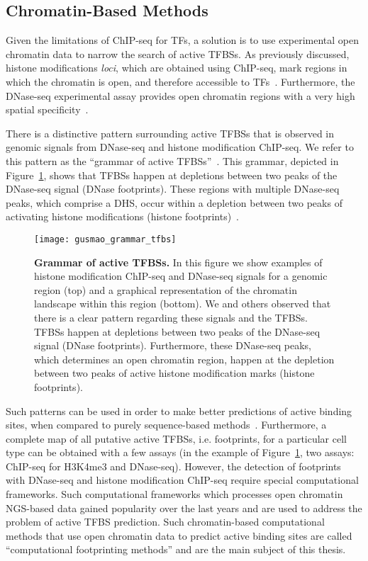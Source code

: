 \subsection{Chromatin-Based Methods}
\label{sec:chromatin.based.method}

Given the limitations of ChIP-seq for TFs, a solution is to use experimental open chromatin data to narrow the search of active TFBSs. As previously discussed, histone modifications \emph{loci}, which are obtained using ChIP-seq, mark regions in which the chromatin is open, and therefore accessible to TFs~\citep{park2009}. Furthermore, the DNase-seq experimental assay provides open chromatin regions with a very high spatial specificity~\citep{boyle2008b}.

There is a distinctive pattern surrounding active TFBSs that is observed in genomic signals from DNase-seq and histone modification ChIP-seq. We refer to this pattern as the ``grammar of active TFBSs''~\citep{gusmao2012,gusmao2014}. This grammar, depicted in Figure~\ref{fig:gusmao_grammar_tfbs}, shows that TFBSs happen at depletions between two peaks of the DNase-seq signal (DNase footprints). These regions with multiple DNase-seq peaks, which comprise a DHS, occur within a depletion between two peaks of activating histone modifications (histone footprints)~\citep{boyle2011,gusmao2014}.

\begin{figure}[h!]
\centering
\texttt{[image: gusmao\_grammar\_tfbs]}
\caption[Grammar of active TFBSs]{\textbf{Grammar of active TFBSs.} In this figure we show examples of histone modification ChIP-seq and DNase-seq signals for a genomic region (top) and a graphical representation of the chromatin landscape within this region (bottom). We and others observed that there is a clear pattern regarding these signals and the TFBSs. TFBSs happen at depletions between two peaks of the DNase-seq signal (DNase footprints). Furthermore, these DNase-seq peaks, which determines an open chromatin region, happen at the depletion between two peaks of active histone modification marks (histone footprints).}
\label{fig:gusmao_grammar_tfbs}
\end{figure}

Such patterns can be used in order to make better predictions of active binding sites, when compared to purely sequence-based methods~\citep{pique2011,cuellar2012}. Furthermore, a complete map of all putative active TFBSs, i.e. footprints, for a particular cell type can be obtained with a few assays (in the example of Figure~\ref{fig:gusmao_grammar_tfbs}, two assays: ChIP-seq for H3K4me3 and DNase-seq). However, the detection of footprints with DNase-seq and histone modification ChIP-seq require special computational frameworks. Such computational frameworks which processes open chromatin NGS-based data gained popularity over the last years and are used to address the problem of active TFBS prediction. Such chromatin-based computational methods that use open chromatin data to predict active binding sites are called ``computational footprinting methods'' and are the main subject of this thesis.

